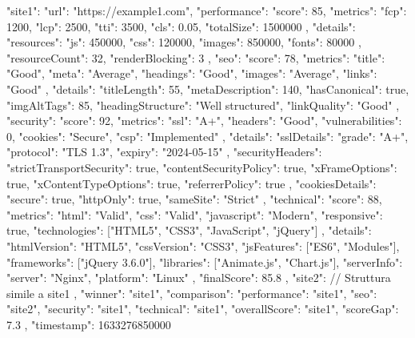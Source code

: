 \begin{asciiart}
{
  "site1": {
    "url": "https://example1.com",
    "performance": {
      "score": 85,
      "metrics": {
        "fcp": 1200,
        "lcp": 2500,
        "tti": 3500,
        "cls": 0.05,
        "totalSize": 1500000
      },
      "details": {
        "resources": {
          "js": 450000,
          "css": 120000,
          "images": 850000,
          "fonts": 80000
        },
        "resourceCount": 32,
        "renderBlocking": 3
      }
    },
    "seo": {
      "score": 78,
      "metrics": {
        "title": "Good",
        "meta": "Average",
        "headings": "Good",
        "images": "Average",
        "links": "Good"
      },
      "details": {
        "titleLength": 55,
        "metaDescription": 140,
        "hasCanonical": true,
        "imgAltTags": 85,
        "headingStructure": "Well structured",
        "linkQuality": "Good"
      }
    },
    "security": {
      "score": 92,
      "metrics": {
        "ssl": "A+",
        "headers": "Good",
        "vulnerabilities": 0,
        "cookies": "Secure",
        "csp": "Implemented"
      },
      "details": {
        "sslDetails": {
          "grade": "A+",
          "protocol": "TLS 1.3",
          "expiry": "2024-05-15"
        },
        "securityHeaders": {
          "strictTransportSecurity": true,
          "contentSecurityPolicy": true,
          "xFrameOptions": true,
          "xContentTypeOptions": true,
          "referrerPolicy": true
        },
        "cookiesDetails": {
          "secure": true,
          "httpOnly": true,
          "sameSite": "Strict"
        }
      }
    },
    "technical": {
      "score": 88,
      "metrics": {
        "html": "Valid",
        "css": "Valid",
        "javascript": "Modern",
        "responsive": true,
        "technologies": ["HTML5", "CSS3", "JavaScript", "jQuery"]
      },
      "details": {
        "htmlVersion": "HTML5",
        "cssVersion": "CSS3",
        "jsFeatures": ["ES6", "Modules"],
        "frameworks": ["jQuery 3.6.0"],
        "libraries": ["Animate.js", "Chart.js"],
        "serverInfo": {
          "server": "Nginx",
          "platform": "Linux"
        }
      }
    },
    "finalScore": 85.8
  },
  "site2": {
    // Struttura simile a site1
  },
  "winner": "site1",
  "comparison": {
    "performance": "site1",
    "seo": "site2",
    "security": "site1",
    "technical": "site1",
    "overallScore": "site1",
    "scoreGap": 7.3
  },
  "timestamp": 1633276850000
}
\end{asciiart}

